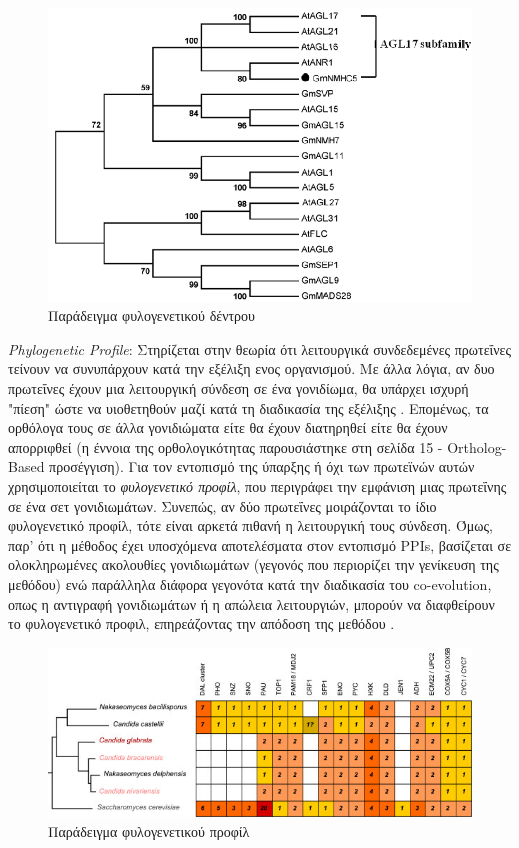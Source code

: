 \begin{figure}[h]
  \centering
  \includegraphics[scale=1]{images/Phylogenetic-tree.png}
  \caption{Παράδειγμα φυλογενετικού δέντρου}
  \label{fig:Phylogenetic-tree}
\end{figure}

\smallskip
\textit{Phylogenetic Profile}: Στηρίζεται στην θεωρία ότι λειτουργικά συνδεδεμένες πρωτεΐνες τείνουν να συνυπάρχουν κατά την εξέλιξη ενος οργανισμού. Με άλλα λόγια, αν δυο πρωτεΐνες έχουν μια λειτουργική σύνδεση σε ένα γονιδίωμα, θα υπάρχει ισχυρή "πίεση" ώστε να υιοθετηθούν μαζί κατά τη διαδικασία της εξέλιξης  \cite{Srinivas2008}. Επομένως, τα ορθόλογα τους σε άλλα γονιδιώματα είτε θα έχουν διατηρηθεί είτε θα έχουν απορριφθεί (η έννοια της ορθολογικότητας παρουσιάστηκε στη σελίδα 15 - Ortholog-Based προσέγγιση). Για τον εντοπισμό της ύπαρξης ή όχι των πρωτεϊνών αυτών χρησιμοποιείται το \textit{φυλογενετικό προφίλ}, που περιγράφει την εμφάνιση μιας πρωτεΐνης σε ένα σετ γονιδιωμάτων. Συνεπώς, αν δύο πρωτεΐνες μοιράζονται το ίδιο φυλογενετικό προφίλ, τότε είναι αρκετά πιθανή η λειτουργική τους σύνδεση. Όμως, παρ' ότι η μέθοδος έχει υποσχόμενα αποτελέσματα στον εντοπισμό PPIs, βασίζεται σε ολοκληρωμένες ακολουθίες γονιδιωμάτων (γεγονός που περιορίζει την γενίκευση της μεθόδου) ενώ παράλληλα διάφορα γεγονότα κατά την διαδικασία του co-evolution, οπως η αντιγραφή γονιδιωμάτων ή η απώλεια λειτουργιών, μπορούν να διαφθείρουν το φυλογενετικό προφιλ, επηρεάζοντας την απόδοση της μεθόδου \cite{Lin2013}.

\begin{figure}[h]
  \centering
  \includegraphics[scale=0.6]{images/Phylogenetic-profile.png}
  \caption{Παράδειγμα φυλογενετικού προφίλ}
  \label{fig:Phylogenetic-profile}
\end{figure}


